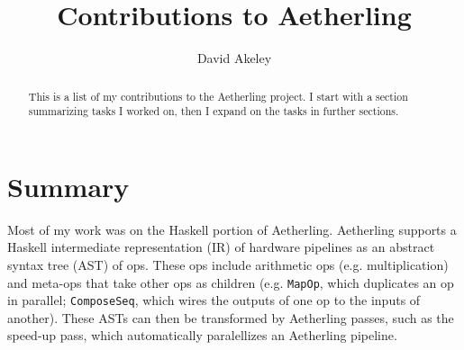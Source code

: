 \documentclass[12pt]{article}
\begin{document}
\sloppy
\title{Contributions to Aetherling}
\author{David Akeley}
\maketitle

\begin{abstract}
This is a list of my contributions to the Aetherling project. I start
with a section summarizing tasks I worked on, then I expand on the
tasks in further sections.
\end{abstract}

\section{Summary}

Most of my work was on the Haskell portion of Aetherling.  Aetherling
supports a Haskell intermediate representation (IR) of hardware
pipelines as an abstract syntax tree (AST) of ops.  These ops include
arithmetic ops (e.g. multiplication) and meta-ops that take other ops
as children (e.g. \texttt{MapOp}, which duplicates an op in parallel;
\texttt{ComposeSeq}, which wires the outputs of one op to the inputs
of another). These ASTs can then be transformed by Aetherling passes,
such as the speed-up pass, which automatically paralellizes an
Aetherling pipeline.
\end{document}

